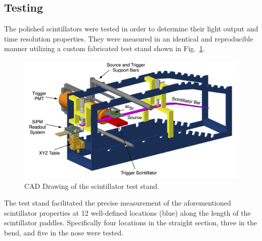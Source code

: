 
\subsection{Testing} \label{sec:fab_test}

The polished scintillators were tested in order to determine their light output and time resolution properties.  They were measured in an identical and reproducible manner utilizing a custom fabricated test stand shown in Fig.~\ref{fig:test_stand_model}. 
	\begin{figure}[!htb]
		\centering
		\includegraphics[width=1.0\columnwidth]{fabrication/figs/test_stand_v2}
		\caption{CAD Drawing of the scintillator test stand.}
		\label{fig:test_stand_model}
	\end{figure}
The test stand facilitated the precise measurement of the aforementioned scintillator properties at 12 well-defined locations (blue) along the length of the scintillator paddles.  Specifically four locations in the straight section, three in the bend, and five in the nose were tested.  

